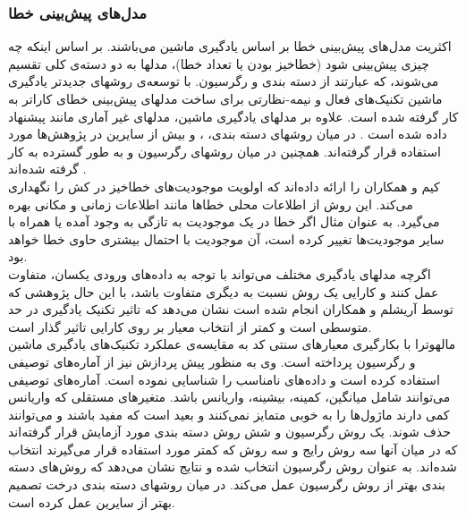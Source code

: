 
\subsubsection{مدل‌های پیش‌بینی خطا}
اکثریت مدل‌های پیش‌بینی خطا بر اساس یادگیری ماشین می‌باشند. بر اساس اینکه چه چیزی پیش‌بینی شود (خطاخیز بودن یا تعداد خطا)، مدلها به دو دسته‌ی کلی تقسیم می‌شوند، که عبارتند از دسته بندی و رگرسیون. با توسعه‌ی روشهای جدیدتر یادگیری ماشین تکنیک‌های فعال و نیمه-نظارتی برای ساخت مدلهای پیش‌بینی خطای کاراتر به کار گرفته شده است\cite{li2012sample}. علاوه بر مدلهای یادگیری ماشین، مدلهای غیر آماری مانند  پیشنهاد داده شده است \cite{kim2007predicting}. در میان روشهای دسته بندی، 
 ،
 و
بیش از سایرین در پژوهش‌ها مورد استفاده قرار گرفته‌اند. همچنین در میان روشهای رگرسیون 
 و 
به طور گسترده به کار گرفته شده‌اند \cite{nam2014survey}. \\
کیم و همکاران  را ارائه داده‌اند که  اولویت موجودیت‌های خطاخیز در کش  را نگهداری  می‌کند. این روش از اطلاعات محلی خطاها مانند اطلاعات زمانی و مکانی بهره می‌گیرد. به عنوان مثال اگر خطا در یک موجودیت به تازگی به وجود آمده یا همراه با سایر موجودیت‌ها تغییر کرده است، آن موجودیت با احتمال بیشتری حاوی خطا خواهد بود.\\
اگرچه مدلهای یادگیری مختلف می‌تواند  با توجه به داده‌های ورودی یکسان، متفاوت عمل کنند و کارایی یک روش نسبت به دیگری متفاوت باشد، با این حال پژوهشی که توسط آریشلم  و همکاران  \cite{arisholm2010systematic} انجام شده است نشان می‌دهد که تاثیر  تکنیک یادگیری در حد متوسطی است و کمتر از انتخاب معیار بر روی کارایی تاثیر گذار است.  \\

مالهوترا با بکارگیری معیارهای سنتی کد به مقایسه‌ی عملکرد تکنیک‌های یادگیری ماشین و رگرسیون پرداخته است\cite{malhotra2014comparative}. وی به منظور پیش پردازش نیز از آماره‌های توصیفی  استفاده کرده است و داده‌های نامناسب را شناسایی نموده است. آماره‌های توصیفی می‌توانند شامل میانگین، کمینه، بیشینه، واریانس باشد. متغیرهای مستقلی که  واریانس کمی دارند ماژول‌ها را به خوبی متمایز نمی‌کنند و بعید است که مفید باشند و می‌توانند حذف شوند. یک روش رگرسیون و شش روش دسته بندی مورد آزمایش قرار گرفته‌اند که در میان آنها سه روش رایج و سه روش که کمتر مورد استفاده قرار می‌گیرند انتخاب شده‌اند.  به عنوان روش رگرسیون انتخاب شده و نتایج نشان می‌دهد که روش‌های دسته بندی بهتر از روش رگرسیون عمل می‌کند. در میان روشهای دسته بندی درخت تصمیم  بهتر از سایرین عمل کرده است. 


